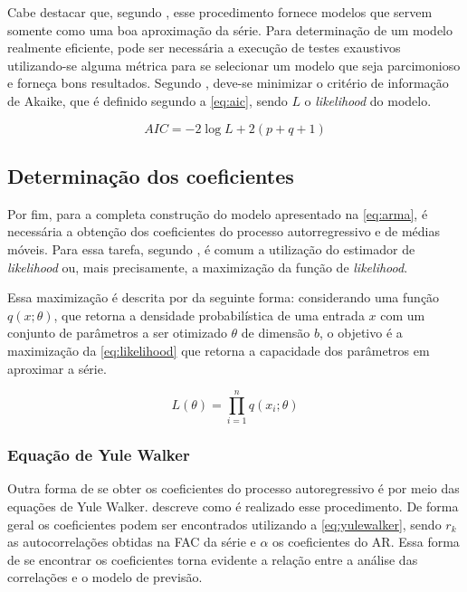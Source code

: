 \documentclass[
    12pt,
    oneside,
    a4paper,
    english,
    brazil
]{abntex2}
\begin{document}
Cabe destacar que, segundo  , esse procedimento fornece modelos
que servem somente  como uma  boa aproximação da série.  Para determinação  de um  
modelo realmente eficiente,  pode  ser necessária  a  execução  de  testes exaustivos 
utilizando-se  alguma métrica para se selecionar um modelo que  seja
parcimonioso  e  forneça  bons  resultados.  Segundo  , deve-se
minimizar   o  critério  de   informação  de  Akaike, que é  definido   segundo  a
\autoref{eq:aic}, sendo $L$ o \textit{likelihood} do modelo.

\begin{equation}
    \label{eq:aic}
    AIC = -2\log{L}+2(p+q+1)
\end{equation}

\subsection{Determinação dos coeficientes}

Por fim, para a completa construção do modelo apresentado na \autoref{eq:arma}, é
necessária a obtenção dos coeficientes  do processo autorregressivo e de médias
móveis. Para essa  tarefa, segundo , é comum  a utilização do
estimador de \textit{likelihood} ou, mais  precisamente, a maximização da função
de \textit{likelihood}.

Essa  maximização   é  descrita   por     da  seguinte
forma:  considerando  uma função  $q(x;\theta)$, que  retorna  a  densidade
probabilística de uma entrada $x$ com um conjunto de parâmetros a ser otimizado
$\theta$ de dimensão $b$, o objetivo é a maximização da \autoref{eq:likelihood}
que retorna a capacidade dos parâmetros em aproximar a série.

\begin{equation}\label{eq:likelihood}
    L(\theta) = \prod_{i=1}^{n}{q(x_i;\theta)}
\end{equation}

\subsubsection{Equação de Yule Walker}

Outra forma de se obter os coeficientes do processo autoregressivo  é por meio das
equações  de Yule  Walker.   descreve como  é realizado  esse
procedimento. De forma geral os coeficientes podem ser encontrados utilizando a
\autoref{eq:yulewalker}, sendo $r_k$ as autocorrelações obtidas na FAC da série
e $\alpha$  os coeficientes do  AR\@. Essa  forma de se encontrar  os coeficientes
torna evidente a relação entre a análise das correlações e o modelo de previsão.
\end{document}
